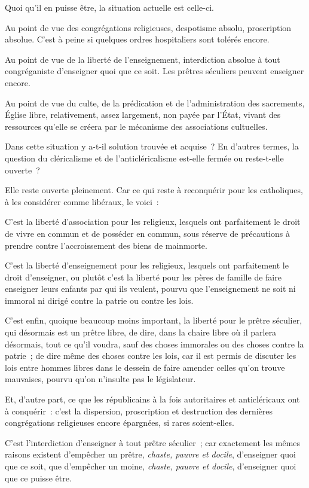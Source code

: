 \documentclass[french,twoside]{book} %
\begin{document}
\noindent Quoi qu’il en puisse être, la situation actuelle est celle-ci.\par
Au point de vue des congrégations religieuses,  despotisme absolu, proscription absolue. C’est à peine si quelques ordres hospitaliers sont tolérés encore.\par
Au point de vue de la liberté de l’enseignement, interdiction absolue à tout congréganiste d’enseigner quoi que ce soit. Les prêtres séculiers peuvent enseigner encore.\par
Au point de vue du culte, de la prédication et de l’administration des sacrements, Église libre, relativement, assez largement, non payée par l’État, vivant des ressources qu’elle se créera par le mécanisme des associations cultuelles.\par
Dans cette situation y a-t-il solution trouvée et acquise ? En d’autres termes, la question du cléricalisme et de l’anticléricalisme est-elle fermée ou reste-t-elle ouverte ?\par
Elle reste ouverte pleinement. Car ce qui reste à reconquérir pour les catholiques, à les considérer comme libéraux, le voici :\par
C’est la liberté d’association pour les religieux, lesquels ont parfaitement le droit de vivre en commun et de posséder en commun, sous réserve de précautions à prendre contre l’accroissement des biens de mainmorte.\par
C’est la liberté d’enseignement pour les religieux, lesquels ont parfaitement le droit d’enseigner, ou plutôt c’est la liberté pour les pères de  famille de faire enseigner leurs enfants par qui ils veulent, pourvu que l’enseignement ne soit ni immoral ni dirigé contre la patrie ou contre les lois.\par
C’est enfin, quoique beaucoup moins important, la liberté pour le prêtre séculier, qui désormais est un prêtre libre, de dire, dans la chaire libre où il parlera désormais, tout ce qu’il voudra, sauf des choses immorales ou des choses contre la patrie ; de dire même des choses contre les lois, car il est permis de discuter les lois entre hommes libres dans le dessein de faire amender celles qu’on trouve mauvaises, pourvu qu’on n’insulte pas le législateur.\par
Et, d’autre part, ce que les républicains à la fois autoritaires et anticléricaux ont à conquérir : c’est la dispersion, proscription et destruction des dernières congrégations religieuses encore épargnées, si rares soient-elles.\par
C’est l’interdiction d’enseigner à tout prêtre séculier ; car exactement les mêmes raisons existent d’empêcher un prêtre, {\itshape chaste, pauvre et docile}, d’enseigner quoi que ce soit, que d’empêcher un moine, {\itshape chaste, pauvre et docile}, d’enseigner quoi que ce puisse être.\par
\end{document}
